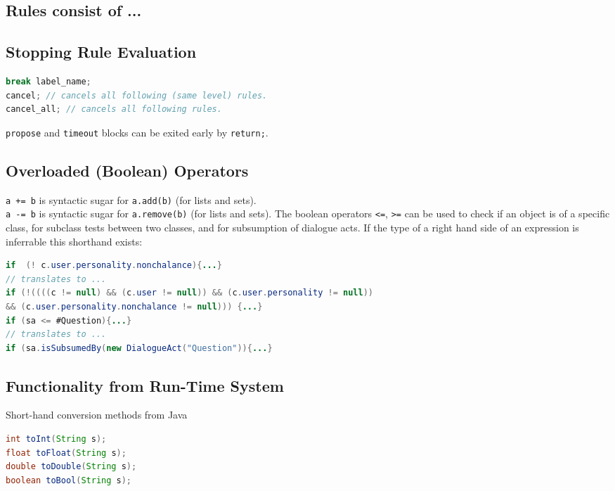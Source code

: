 \documentclass[5pt]{article}
\begin{document}
\begin{multicols}{2}
\begin{bodybox}{\subsection*{\normalsize Rules consist of ...}}
\begin{enumerate}[label=...]
        \end{enumerate}
        \end{bodybox}
        \begin{bodybox}{\subsection*{\normalsize Stopping Rule Evaluation}}
            \begin{lstlisting}[language=Java]
break label_name;
cancel; // cancels all following (same level) rules.
cancel_all; // cancels all following rules.
            \end{lstlisting}
            \verb|propose| and \verb|timeout| blocks can be exited early by \verb|return;|.
        \end{bodybox}
        \begin{bodybox}{\subsection*{\normalsize Overloaded (Boolean) Operators}}
            \verb|a += b| is syntactic sugar for \verb|a.add(b)| (for lists and sets).\\
            \verb|a -= b| is syntactic sugar for \verb|a.remove(b)| (for lists and sets).
        The boolean operators \verb|<=|, \verb|>=| can be used to check if an object is of a specific class, for subclass tests between two classes, and for subsumption of dialogue acts.
        If the type of a right hand side of an expression is inferrable this shorthand exists:
        \begin{lstlisting}[language=Java]
if  (! c.user.personality.nonchalance){...}
// translates to ...
if (!((((c != null) && (c.user != null)) && (c.user.personality != null))
&& (c.user.personality.nonchalance != null))) {...}
if (sa <= #Question){...}
// translates to ...
if (sa.isSubsumedBy(new DialogueAct("Question")){...}
        \end{lstlisting}
        \end{bodybox}
        \begin{bodybox}{\subsection*{\normalsize Functionality from Run-Time System}}
        Short-hand conversion methods from Java
        \begin{lstlisting}[language=Java]
int toInt(String s);
float toFloat(String s);
double toDouble(String s);
boolean toBool(String s);

\end{lstlisting}
\end{bodybox}
\end{multicols}
\end{document}
